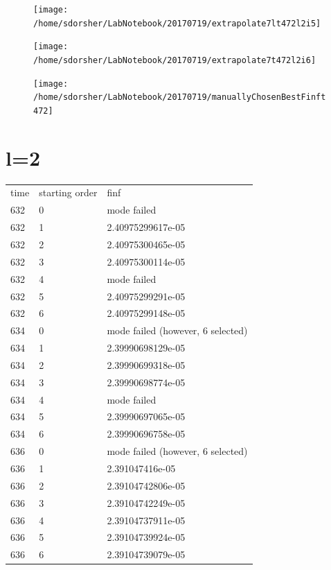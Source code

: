 \begin{figure}
  \texttt{[image: /home/sdorsher/LabNotebook/20170719/extrapolate7lt472l2i5]}
\end{figure}

\begin{figure}
  \texttt{[image: /home/sdorsher/LabNotebook/20170719/extrapolate7t472l2i6]}
\end{figure}

\begin{figure}
  \texttt{[image: /home/sdorsher/LabNotebook/20170719/manuallyChosenBestFinft472]}
\end{figure}


\section{l=2}
\begin{table}
  \begin{tabular}{lll}
    time & starting order & finf\\
    632 & 0 & mode failed\\
    632 & 1 & 2.40975299617e-05\\
    632 & 2 & 2.40975300465e-05\\
    632 & 3 & 2.40975300114e-05\\
    632 & 4 & mode failed\\
    632 & 5 & 2.40975299291e-05\\
    632 & 6 & 2.40975299148e-05\\
    \hline
    634 & 0 & mode failed (however, 6 selected)\\
    634 & 1 & 2.39990698129e-05\\
    634 & 2 & 2.39990699318e-05\\
    634 & 3 & 2.39990698774e-05\\
    634 & 4 & mode failed\\
    634 & 5 & 2.39990697065e-05\\
    634 & 6 & 2.39990696758e-05\\
    \hline
    636 & 0 & mode failed (however, 6 selected)\\
    636 & 1 & 2.391047416e-05\\
    636 & 2 & 2.39104742806e-05\\
    636 & 3 & 2.39104742249e-05\\
    636 & 4 & 2.39104737911e-05\\
    636 & 5 & 2.39104739924e-05\\
    636 & 6 & 2.39104739079e-05\\
  \end{tabular}
\end{table}

